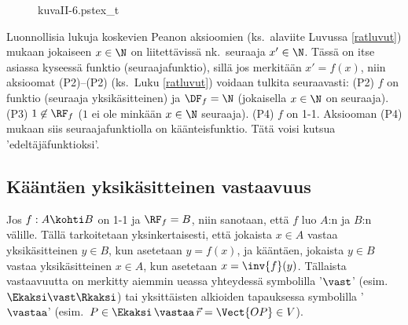 \begin{figure}[H]
\begin{center}
{kuvaII-6.pstex_t}
\end{center}
\end{figure}
\begin{Exa} Luonnollisia lukuja koskevien Peanon aksioomien (ks.\ alaviite Luvussa
\ref{ratluvut}) mukaan jokaiseen $x\in\N$ on liitettävissä nk.\ seuraaja $x'\in\N$.
Tässä on itse asiassa kyseessä funktio (seuraajafunktio), sillä jos merkitään $x'=f(x)$, niin
aksioomat (P2)--(P2) (ks.\ Luku \ref{ratluvut}) voidaan tulkita seuraavasti: (P2) $f$ on
funktio (seuraaja yksikäsitteinen) ja $\DF_f=\N$ (jokaisella $x\in\N$ on seuraaja).
(P3) $1\not\in\RF_f$ ($1$ ei ole minkään $x\in\N$ seuraaja). (P4) $f$ on 1-1. 
Aksiooman (P4) mukaan siis seuraajafunktiolla on käänteisfunktio. Tätä voisi kutsua
'edeltäjäfunktioksi'. \loppu
\end{Exa}

\subsection{Kääntäen yksikäsitteinen vastaavuus}

Jos $f: A \kohti B$ on 1-1 ja $\RF_f=B$, niin sanotaan, että $f$ luo  $A$:n ja $B$:n välille. Tällä tarkoitetaan yksinkertaisesti,
että jokaista $x \in A$ vastaa yksikäsitteinen $y \in B$, kun asetetaan $y=f(x)$, ja kääntäen,
jokaista $y \in B$ vastaa yksikäsitteinen $x \in A$, kun asetetaan $x=\inv{f}(y)$. Tällaista
vastaavuutta on merkitty aiemmin ueassa yhteydessä symbolilla '$\vast$'
(esim.\ $\Ekaksi \vast \Rkaksi$) tai yksittäisten alkioiden tapauksessa symbolilla '$\vastaa$'
(esim.\ $P\in\Ekaksi\,\vastaa\,\vec r=\Vect{OP} \in V$). 